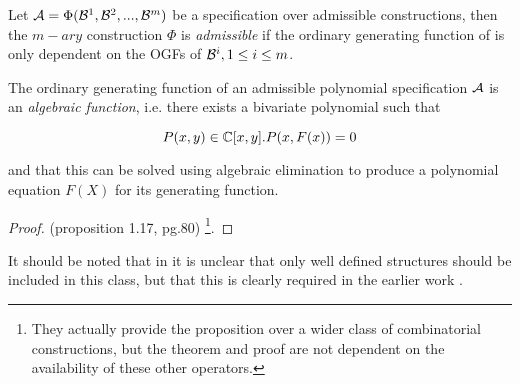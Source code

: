\begin{df}

Let $\mathcal{A} = \Phi( \mathcal{B}^1, \mathcal{B}^2, ..., \mathcal{B}^m )$ be a specification over admissible constructions,
then the $m-ary$ construction $\Phi$ is \emph{admissible} if the ordinary generating function of 
is only dependent on the OGFs of $\mathcal{B}^i, 1 \le i \le m$.

\end{df}
\noindent

\begin{theorem}\label{OGFPolynomialClass}
The ordinary generating function of an admissible polynomial specification $\mathcal{A}$ is an \emph{algebraic function}, 
i.e. there exists a bivariate polynomial such that

$$P(x, y) \in \mathbb{C}[x,y] . P(x, F(x)) = 0$$

and that this can be solved using algebraic elimination to produce 
a polynomial equation $F(X)$ for its generating function.

\end{theorem}
\begin{proof}
\cite{FlajoletSedgewick2009} (proposition 1.17, pg.80)%
\footnote{They actually provide the proposition over a wider class of combinatorial constructions,
but the theorem and proof are not dependent on the availability of these other operators.}.
\end{proof}

\noindent
It should be noted that in \cite{FlajoletSedgewick2009} 
it is unclear that only well defined structures
should be included in this class,
but that this is clearly required in the earlier work \cite{FlSaZi91}.

